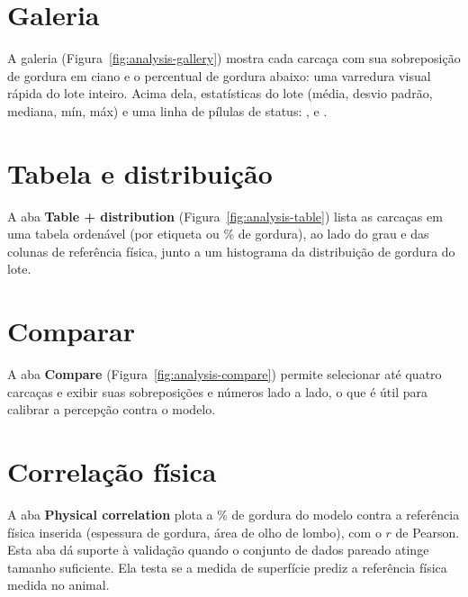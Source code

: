 \section{Galeria}

A galeria (Figura~\ref{fig:analysis-gallery}) mostra cada carcaça com sua sobreposição
de gordura em ciano e o percentual de gordura abaixo: uma varredura visual rápida do
lote inteiro. Acima dela, estatísticas do lote (média, desvio padrão, mediana, mín, máx) e uma
linha de pílulas de status: ,
 e .


\section{Tabela e distribuição}

A aba \textbf{Table + distribution} (Figura~\ref{fig:analysis-table}) lista as
carcaças em uma tabela ordenável (por etiqueta ou \% de gordura), ao lado do grau e das
colunas de referência física, junto a um histograma da distribuição de gordura do lote.


\section{Comparar}

A aba \textbf{Compare} (Figura~\ref{fig:analysis-compare}) permite selecionar até
quatro carcaças e exibir suas sobreposições e números lado a lado, o que é útil para
calibrar a percepção contra o modelo.


\section{Correlação física}

A aba \textbf{Physical correlation} plota a \% de gordura do modelo contra a referência
física inserida (espessura de gordura, área de olho de lombo), com o $r$ de Pearson.
Esta aba dá suporte à validação quando o conjunto de dados pareado atinge tamanho
suficiente. Ela testa se a medida de superfície prediz a referência física medida no
animal.
